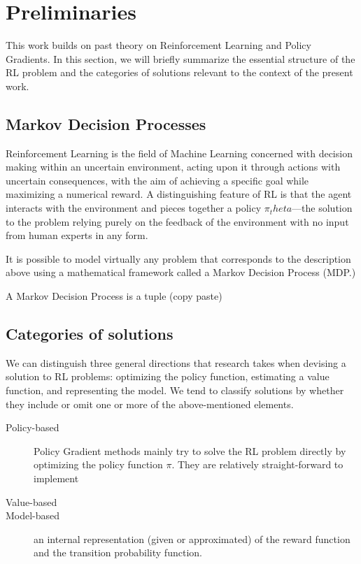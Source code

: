 \section{Preliminaries}

This work builds on past theory on Reinforcement Learning and Policy Gradients. In this section, we will briefly summarize the essential structure of the RL problem and the categories of solutions relevant to the context of the present work.

\subsection{Markov Decision Processes}

Reinforcement Learning is the field of Machine Learning concerned with decision making within an uncertain environment, acting upon it through actions with uncertain consequences, with the aim of achieving a specific goal while maximizing a numerical reward. A distinguishing feature of RL is that the agent interacts with the environment and pieces together a policy $\pi_theta$—the solution to the problem relying purely on the feedback of the environment with no input from human experts in any form. 

It is possible to model virtually any problem that corresponds to the description above using a mathematical framework called a Markov Decision Process (MDP.)

\begin{definition}
A Markov Decision Process is a tuple (copy paste)
\end{definition}

\subsection{Categories of solutions}

We can distinguish three general directions that research takes when devising a solution to RL problems: optimizing the policy function, estimating a value function, and representing the model. We tend to classify solutions by whether they include or omit one or more of the above-mentioned elements.

\begin{description}
\item[Policy-based] Policy Gradient methods mainly try to solve the RL problem directly by optimizing the policy function $\pi$. They are relatively straight-forward to implement 
\item[Value-based]
\item[Model-based] an internal representation (given or approximated) of the reward function and the transition probability function.
\end{description}

